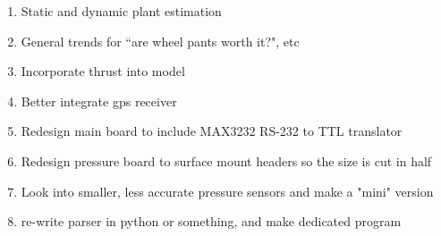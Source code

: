 \begin{enumerate}
\item Static and dynamic plant estimation
\item General trends for ``are wheel pants worth it?", etc
\item Incorporate thrust into model
\item Better integrate gps receiver
\item Redesign main board to include MAX3232 RS-232 to TTL translator
\item Redesign pressure board to surface mount headers so the size is cut in half
\item Look into smaller, less accurate pressure sensors and make a "mini" version
\item re-write parser in python or something, and make dedicated program
\end{enumerate}